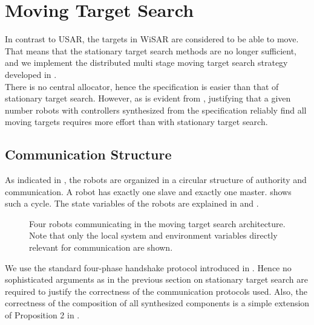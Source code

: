 \section{Moving Target Search} \label{sec:implmovt}

In contrast to USAR, the targets in WiSAR are considered to be able to move. That means that the stationary target search methods are no longer sufficient, and we implement the distributed multi stage moving target search strategy developed in .\\

There is no central allocator, hence the specification is easier than that of stationary target search. However, as is evident from , justifying that a given number robots with controllers synthesized from the specification reliably find all moving targets requires more effort than with stationary target search.\\


\subsection{Communication Structure} \label{sec:commstructure} 

As indicated in , the robots are organized in a circular structure of authority and communication. A robot  has exactly one slave and exactly one master.  shows such a cycle. The state variables of the robots are explained in  and .\\

\newcommand{\dist}{0.2pc}
\newcommand{\ratio}{0.35}
\newcommand{\robot}[1]{*++[o][F-]{R_{#1}}}
\begin{figure}[h!]

\caption{Four robots communicating in the moving target search architecture. Note that only the local system and environment variables directly relevant for communication are shown.}
\label{fig:commstructure}
\end{figure}

We use the standard four-phase handshake protocol introduced in . Hence no sophisticated arguments as in the previous section on stationary target search are required to justify the correctness of the communication protocols used. Also, the correctness of the composition of all synthesized components is a simple extension of Proposition 2 in .\\

